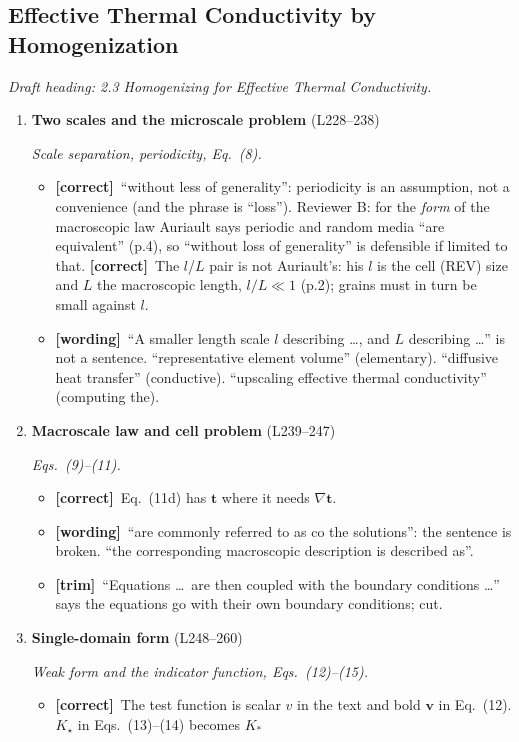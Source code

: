 \documentclass[11pt]{article}
\newcommand{\Pg}[3]{\item \textbf{#1} {\small(#2)}\par\textit{#3}}
\newcommand{\tC}{\textcolor{miss}{\textbf{[correct]}}\ }
\newcommand{\tG}{\textcolor{stale}{\textbf{[wording]}}\ }
\newcommand{\tT}{\textcolor{cut}{\textbf{[trim]}}\ }
\newcommand{\add}[1]{\textcolor{revB}{#1}}
\begin{document}
\subsection{Effective Thermal Conductivity by Homogenization}
\textit{Draft heading: 2.3 Homogenizing for Effective Thermal Conductivity.}
\begin{enumerate}
\Pg{Two scales and the microscale problem}{L228--238}{Scale separation, periodicity, Eq.~(8).}
  \begin{itemize}
  \item \tC ``without less of generality'': periodicity is an assumption,
    not a convenience (and the phrase is ``loss'').
    \add{Reviewer B: for the \emph{form} of the macroscopic law Auriault says periodic and random media ``are equivalent''
    (p.4), so ``without loss of generality'' is defensible if limited to that. \tC The $l$/$L$ pair is not Auriault's: his
    $l$ is the cell (REV) size and $L$ the macroscopic length, $l/L \ll 1$ (p.2); grains must in turn be small against $l$.}
  \item \tG ``A smaller length scale $l$ describing \ldots, and $L$
    describing \ldots'' is not a sentence. ``representative element
    volume'' (elementary). ``diffusive heat transfer'' (conductive).
    ``upscaling effective thermal conductivity'' (computing the).
  \end{itemize}
\Pg{Macroscale law and cell problem}{L239--247}{Eqs.~(9)--(11).}
  \begin{itemize}
  \item \tC Eq.~(11d) has $\mathbf{t}$ where it needs $\nabla\mathbf{t}$.
  \item \tG ``are commonly referred to as co the solutions'': the sentence
    is broken. ``the corresponding macroscopic description is described
    as''.
  \item \tT ``Equations \ldots\ are then coupled with the boundary conditions
    \ldots'' says the equations go with their own boundary conditions; cut.
  \end{itemize}
\Pg{Single-domain form}{L248--260}{Weak form and the indicator function, Eqs.~(12)--(15).}
  \begin{itemize}
  \item \tC The test function is scalar $v$ in the text and bold
    $\mathbf{v}$ in Eq.~(12). $K_\star$ in Eqs.~(13)--(14) becomes $K_{*}$

\end{itemize}
\end{enumerate}
\end{document}
